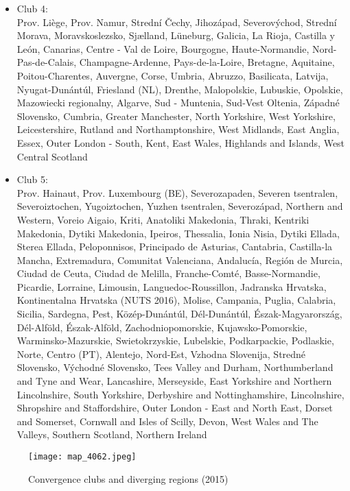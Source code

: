 \documentclass[11pt]{article}
\begin{document}
\begin{itemize}
\item Club 4:\\
Prov. Liège, Prov. Namur, Strední Čechy, Jihozápad, Severovýchod, Strední Morava, Moravskoslezsko, Sjælland, Lüneburg, Galicia, La Rioja, Castilla y León, Canarias, Centre - Val de Loire, Bourgogne, Haute-Normandie, Nord-Pas-de-Calais, Champagne-Ardenne, Pays-de-la-Loire, Bretagne, Aquitaine, Poitou-Charentes, Auvergne, Corse, Umbria, Abruzzo, Basilicata, Latvija, Nyugat-Dunántúl, Friesland (NL), Drenthe, Malopolskie, Lubuskie, Opolskie, Mazowiecki regionalny, Algarve, Sud - Muntenia, Sud-Vest Oltenia, Západné Slovensko, Cumbria, Greater Manchester, North Yorkshire, West Yorkshire, Leicestershire, Rutland and Northamptonshire, West Midlands, East Anglia, Essex, Outer London - South, Kent, East Wales, Highlands and Islands, West Central Scotland

\item Club 5:\\
	
Prov. Hainaut, Prov. Luxembourg (BE), Severozapaden, Severen tsentralen, Severoiztochen, Yugoiztochen, Yuzhen tsentralen, Severozápad, Northern and Western, Voreio Aigaio, Kriti, Anatoliki Makedonia, Thraki, Kentriki Makedonia, Dytiki Makedonia, Ipeiros, Thessalia, Ionia Nisia, Dytiki Ellada, Sterea Ellada, Peloponnisos, Principado de Asturias, Cantabria, Castilla-la Mancha, Extremadura, Comunitat Valenciana, Andalucía, Región de Murcia, Ciudad de Ceuta, Ciudad de Melilla, Franche-Comté, Basse-Normandie, Picardie, Lorraine, Limousin, Languedoc-Roussillon, Jadranska Hrvatska, Kontinentalna Hrvatska (NUTS 2016), Molise, Campania, Puglia, Calabria, Sicilia, Sardegna, Pest, Közép-Dunántúl, Dél-Dunántúl, Észak-Magyarország, Dél-Alföld, Észak-Alföld, Zachodniopomorskie, Kujawsko-Pomorskie, Warminsko-Mazurskie, Swietokrzyskie, Lubelskie, Podkarpackie, Podlaskie, Norte, Centro (PT), Alentejo, Nord-Est, Vzhodna Slovenija, Stredné Slovensko, Východné Slovensko, Tees Valley and Durham, Northumberland and Tyne and Wear, Lancashire, Merseyside, East Yorkshire and Northern Lincolnshire, South Yorkshire, Derbyshire and Nottinghamshire, Lincolnshire, Shropshire and Staffordshire, Outer London - East and North East, Dorset and Somerset, Cornwall and Isles of Scilly, Devon, West Wales and The Valleys, Southern Scotland, Northern Ireland


\end{itemize}

\begin{figure}%
\centering 
  {\texttt{[image: map\_4062.jpeg]} }
  \caption{Convergence clubs and diverging regions (2015)}
  \label{clubs_graphic_2015}
  \end{figure}  
  
\end{document}
